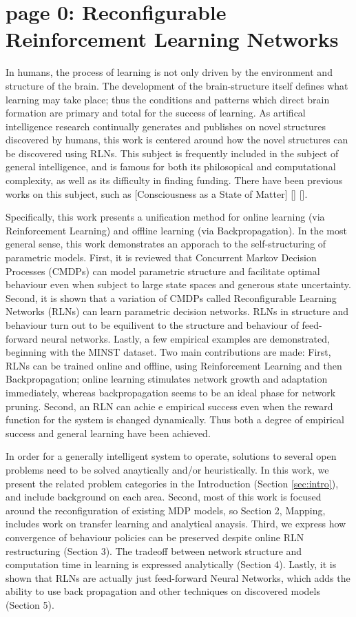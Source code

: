  

\section*{page 0: Reconfigurable Reinforcement Learning Networks}

In humans, the process of learning is not only driven by the environment and structure of the brain. The development of the brain-structure itself defines what learning may take place; thus the conditions and patterns which direct brain formation are primary and total for the success of learning. As artifical intelligence research continually generates and publishes on novel structures discovered by humans, this work is centered around how the novel structures can be discovered using RLNs. This subject is frequently included in the subject of general intelligence, and is famous for both its philosopical and computational complexity, as well as its difficulty in finding funding. There have been previous works on this subject, such as [Consciousness as a State of Matter] [] []. 

Specifically, this work presents a unification method for online learning (via Reinforcement Learning) and offline learning (via Backpropagation). In the most general sense, this work demonstrates an apporach to the self-structuring of parametric models. First, it is reviewed that Concurrent Markov Decision Processes (CMDPs) can model parametric structure and facilitate optimal behaviour even when subject to large state spaces and generous state uncertainty. Second, it is shown that a variation of CMDPs called Reconfigurable Learning Networks (RLNs) can learn parametric decision networks. RLNs in structure and behaviour turn out to be equilivent to the structure and behaviour of feed-forward neural networks. Lastly, a few empirical examples are demonstrated, beginning with the MINST dataset. Two main contributions are made: First, RLNs can be trained online and offline, using Reinforcement Learning and then Backpropagation; online learning stimulates network growth and adaptation immediately, whereas backpropagation seems to be an ideal phase for network pruning.  Second, an RLN can achie e empirical success even when the reward function for the system is changed dynamically. Thus both a degree of empirical success and general learning have been achieved.

In order for a generally intelligent system to operate, solutions to several open problems need to be solved anaytically and/or heuristically. In this work, we present the related problem categories in the Introduction (Section \ref{sec:intro}), and include background on each area. Second, most of this work is focused around the reconfiguration of existing MDP models, so Section 2, Mapping, includes work on transfer learning and analytical anaysis. Third, we express how convergence of behaviour policies can be preserved despite online RLN restructuring (Section 3). The tradeoff between network structure and computation time  in learning is expressed analytically (Section 4). Lastly, it is shown that RLNs are actually just feed-forward Neural Networks, which adds the ability to use back propagation and other techniques on discovered models (Section 5).

